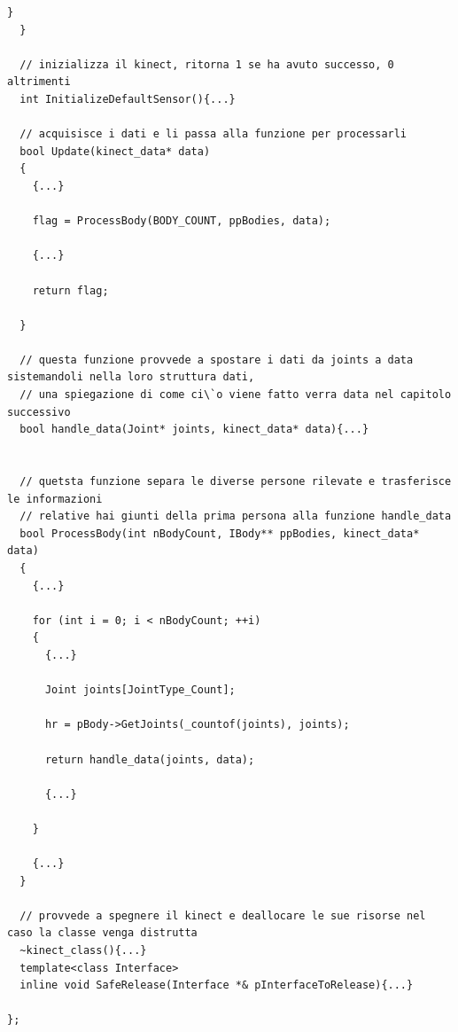 \documentclass[10pt,a4paper]{article}
\begin{document}
\begin{lstlisting}[style=mycpp, caption=librerie usate, captionpos=b]
    }
  }

  // inizializza il kinect, ritorna 1 se ha avuto successo, 0 altrimenti
  int InitializeDefaultSensor(){...}

  // acquisisce i dati e li passa alla funzione per processarli
  bool Update(kinect_data* data)
  {
    {...}
    
    flag = ProcessBody(BODY_COUNT, ppBodies, data);
    
    {...}
    
    return flag;
    
  }

  // questa funzione provvede a spostare i dati da joints a data sistemandoli nella loro struttura dati, 
  // una spiegazione di come ci\`o viene fatto verra data nel capitolo successivo
  bool handle_data(Joint* joints, kinect_data* data){...}
  

  // quetsta funzione separa le diverse persone rilevate e trasferisce le informazioni 
  // relative hai giunti della prima persona alla funzione handle_data
  bool ProcessBody(int nBodyCount, IBody** ppBodies, kinect_data* data)
  {
    {...}
    
    for (int i = 0; i < nBodyCount; ++i)
    {
      {...}
      
      Joint joints[JointType_Count];

      hr = pBody->GetJoints(_countof(joints), joints);
      
      return handle_data(joints, data);
          
      {...}
      
    }
    
    {...}
  }

  // provvede a spegnere il kinect e deallocare le sue risorse nel caso la classe venga distrutta
  ~kinect_class(){...}
  template<class Interface>
  inline void SafeRelease(Interface *& pInterfaceToRelease){...}

};
\end{lstlisting}
%
%
\end{document}
